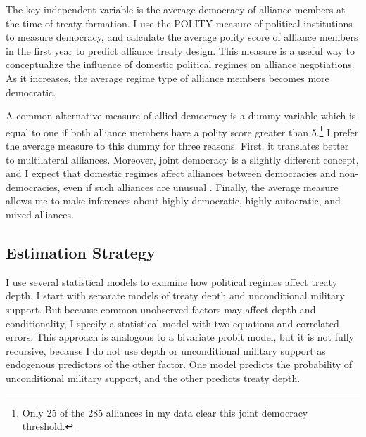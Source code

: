 \documentclass[12pt]{article}
\begin{document}
The key independent variable is the average democracy of alliance members at the time of treaty formation. 
I use the POLITY measure of political institutions to measure democracy, and calculate the average polity score of alliance members in the first year to predict alliance treaty design. 
This measure is a useful way to conceptualize the influence of domestic political regimes on alliance negotiations. 
As it increases, the average regime type of alliance members becomes more democratic. 


A common alternative measure of allied democracy is a dummy variable which is equal to one if both alliance members have a polity score greater than 5.\footnote{Only 25 of the 285 alliances in my data clear this joint democracy threshold.}
I prefer the average measure to this dummy for three reasons.
First, it translates better to multilateral alliances. 
Moreover, joint democracy is a slightly different concept, and I expect that domestic regimes affect alliances between democracies and non-democracies, even if such alliances are unusual \citep{Leeds1999}.
Finally, the average measure allows me to make inferences about highly democratic, highly autocratic, and mixed alliances. 



\subsection{Estimation Strategy}

I use several statistical models to examine how political regimes affect treaty depth. 
I start with separate models of treaty depth and unconditional military support. 
But because common unobserved factors may affect depth and conditionality, I specify a statistical model with two equations and correlated errors.
This approach is analogous to a bivariate probit model, but it is not fully recursive, because I do not use depth or unconditional military support as endogenous predictors of the other factor. 
One model predicts the probability of unconditional military support, and the other predicts treaty depth.
\end{document}
